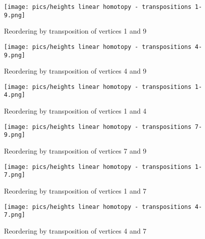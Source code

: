 \documentclass{article}
\begin{document}
\begin{figure}[htbp]
    \centering
    \texttt{[image: pics/heights linear homotopy - transpositions 1-9.png]}
    \caption{Reordering by transposition of vertices 1 and 9}
    \label{fig:transposition1and9}
\end{figure}
\begin{figure}[htbp]
    \centering
    \texttt{[image: pics/heights linear homotopy - transpositions 4-9.png]}
    \caption{Reordering by transposition of vertices 4 and 9}
    \label{fig:transposition4and9}
\end{figure}
\begin{figure}[htbp]
    \centering
    \texttt{[image: pics/heights linear homotopy - transpositions 1-4.png]}
    \caption{Reordering by transposition of vertices 1 and 4}
    \label{fig:transposition1and4}
\end{figure}
\begin{figure}[htbp]
    \centering
    \texttt{[image: pics/heights linear homotopy - transpositions 7-9.png]}
    \caption{Reordering by transposition of vertices 7 and 9}
    \label{fig:transposition7and9}
\end{figure}
\begin{figure}[htbp]
    \centering
    \texttt{[image: pics/heights linear homotopy - transpositions 1-7.png]}
    \caption{Reordering by transposition of vertices 1 and 7}
    \label{fig:transposition1and7}
\end{figure}
\begin{figure}[htbp]
    \centering
    \texttt{[image: pics/heights linear homotopy - transpositions 4-7.png]}
    \caption{Reordering by transposition of vertices 4 and 7}
    \label{fig:transposition4and7}
\end{figure}
\end{document}
